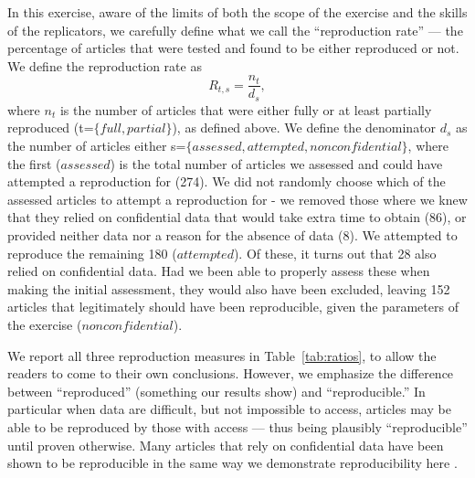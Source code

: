 \documentclass{cje} %
\theoremstyle{plain}%
\theoremstyle{definition}
\theoremstyle{remark}
\begin{document}
In this exercise, aware of the limits of both the scope of the exercise and the skills of the replicators, we carefully define what we call the ``reproduction rate'' --- the percentage of articles that were tested and found to be either reproduced or not. 
We define the reproduction rate as
\begin{equation}
	R_{t,s}=\frac{n_{t}}{d_{s}},
\end{equation}
where $n_{t}$ is the number of articles that were either fully or at least partially reproduced (t=$\lbrace full,partial\rbrace$), as defined above. 
%
We  define the denominator $d_{s}$ as the number of articles either s=$\lbrace assessed, attempted, nonconfidential\rbrace$,  
%
where the first ($assessed$) is the total number of articles we assessed and could have attempted a reproduction for (274). We did not randomly choose which of the assessed articles to attempt a reproduction for - we removed those where we knew that they relied on confidential data that would take extra time to obtain (86), or provided neither data nor a reason for the absence of data (8). We attempted to reproduce the remaining 180 ($attempted$). Of these, it turns out that 28 also relied on confidential data. Had we been able to properly assess these when making the initial assessment, they would also have been excluded, leaving 152 articles that legitimately should have been reproducible, given the parameters of the exercise ($nonconfidential$).


We  report all three reproduction measures in Table~\ref{tab:ratios}, to allow the readers to come to their own conclusions. However, we emphasize the difference between ``reproduced'' (something our results show) and ``reproducible.'' In particular when data are difficult, but not impossible to access, articles may be able to be reproduced by those with access --- thus being plausibly ``reproducible'' until proven otherwise. Many articles that rely on confidential data have been shown to be reproducible in the same way we demonstrate reproducibility here \citep{perignon2019a,vilhuber2021,vilhuber2022a}. 
\end{document}
